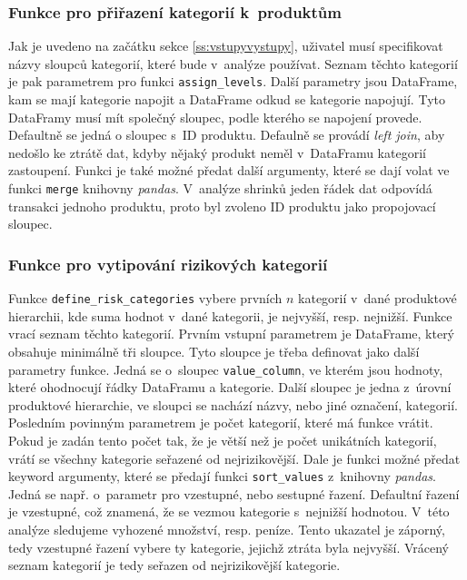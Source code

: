\subsubsection*{Funkce pro přiřazení kategorií k~produktům}

Jak je uvedeno na začátku sekce \ref*{ss:vstupyvystupy}, uživatel musí specifikovat názvy sloupců kategorií, které bude v~analýze používat. Seznam těchto kategorií je pak parametrem pro funkci \texttt{assign\_levels}. Další parametry jsou DataFrame, kam se mají kategorie napojit a DataFrame odkud se kategorie napojují. Tyto DataFramy musí mít společný sloupec, podle kterého se napojení provede. Defaultně se jedná o sloupec s~ID produktu. Defaulně se provádí \emph{left join}, aby nedošlo ke ztrátě dat, kdyby nějaký produkt neměl v~DataFramu kategorií zastoupení. Funkci je také možné předat další argumenty, které se dají volat ve funkci \texttt{merge} knihovny \emph{pandas}. V~analýze shrinků jeden řádek dat odpovídá transakci jednoho produktu, proto byl zvoleno ID produktu jako propojovací sloupec.

\subsubsection*{Funkce pro vytipování rizikových kategorií}

Funkce \texttt{define\_risk\_categories} vybere prvních $n$ kategorií v~dané produktové hierarchii, kde suma hodnot v~dané kategorii, je nejvyšší, resp. nejnižší. Funkce vrací seznam těchto kategorií. Prvním vstupní parametrem je DataFrame, který obsahuje minimálně tři sloupce. Tyto sloupce je třeba definovat jako další parametry funkce. Jedná se o~sloupec \texttt{value\_column}, ve kterém jsou hodnoty, které ohodnocují řádky DataFramu a kategorie. Další sloupec je jedna z~úrovní produktové hierarchie, ve sloupci se nachází názvy, nebo jiné označení, kategorií. Posledním povinným parametrem je počet kategorií, které má funkce vrátit. Pokud je zadán tento počet tak, že je větší než je počet unikátních kategorií, vrátí se všechny kategorie seřazené od nejrizikovější. Dale je funkci možné předat keyword argumenty, které se předají funkci \texttt{sort\_values} z~knihovny \emph{pandas}. Jedná se např. o~parametr pro vzestupné, nebo sestupné řazení. Defaultní řazení je vzestupné, což znamená, že se vezmou kategorie s~nejnižší hodnotou. V~této analýze sledujeme vyhozené množství, resp. peníze. Tento ukazatel je záporný, tedy vzestupné řazení vybere ty kategorie, jejichž ztráta byla nejvyšší. Vrácený seznam kategorií je tedy seřazen od nejrizikovější kategorie.

